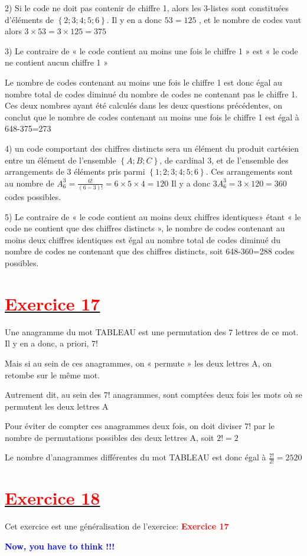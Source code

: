 \documentclass[12pt]{article}
\begin{document}
2) Si le code ne doit pas contenir de chiffre 1, alors les 3-listes sont constituées d’éléments de $\left\lbrace 2 ;3 ;4 ;5 ;6\right\rbrace $. Il y en a donc $53 = 125$ , et le nombre de codes vaut alors $3 \times 53 = 3 \times 125 = 375$

3) Le contraire de « le code contient au moins une fois le chiffre 1 » est « le code ne contient aucun chiffre 1 »

Le nombre de codes contenant au moins une fois le chiffre 1 est donc égal au nombre total de codes diminué du nombre
de codes ne contenant pas le chiffre 1. Ces deux nombres ayant été calculés dans les deux questions précédentes, on
conclut que le nombre de codes contenant au moins une fois le chiffre 1 est égal à 648-375=273

4) un code comportant des chiffres distincts sera un élément du produit cartésien entre un élément de l’ensemble $\left\lbrace A ;B ;C\right\rbrace $, de cardinal 3, et de l’ensemble des arrangements de 3 éléments pris parmi $\left\lbrace 1 ;2 ;3 ;4 ;5 ;6\right\rbrace $. Ces arrangements sont au nombre de 
$A_{6}^{3}=\frac{6!}{(6-3)!}=6 \times 5 \times 4 = 120$ Il y a donc $3A_{6}^{3}=3\times120=360$ codes possibles.

5) Le contraire de « le code contient au moins deux chiffres identiques» étant « le code ne contient que des chiffres
distincts », le nombre de codes contenant au moins deux chiffres identiques est égal au nombre total de codes diminué du
nombre de codes ne contenant que des chiffres distincts, soit 648-360=288 codes possibles.
\section*{\underline{\textbf{\textcolor{red}{Exercice 17}}}}
Une anagramme du mot TABLEAU est une permutation des $7$ lettres de ce mot. Il y en a donc, a priori, $7 !$

Mais si au sein de ces anagrammes, on « permute » les deux lettres A, on retombe sur le même mot.

Autrement dit, au sein des $7 !$ anagrammes, sont comptées deux fois les mots où se permutent les deux lettres A

Pour éviter de compter ces anagrammes deux fois, on doit diviser $7 !$ par le nombre de permutations possibles des deux
lettres A, soit $2 !=2$

Le nombre d’anagrammes différentes du mot TABLEAU est donc égal à $\frac{7!}{2!}=2520$
\section*{\underline{\textbf{\textcolor{red}{Exercice 18}}}}
Cet exercice est une généralisation de l'exercice: \textbf{\textcolor{red}{Exercice 17}}

\textbf{\textcolor{blue}{Now, you have to think !!!}}
\end{document}
